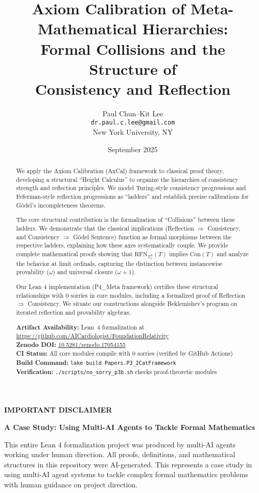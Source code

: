 \documentclass[11pt]{article}
\title{Axiom Calibration of Meta-Mathematical Hierarchies:\\
Formal Collisions and the Structure of\\
Consistency and Reflection}
\author{Paul Chun--Kit Lee\\
\texttt{dr.paul.c.lee@gmail.com}\\
New York University, NY}
\date{September 2025}
\newcommand{\Con}{\mathrm{Con}}
\newcommand{\RFNSigOne}{\mathrm{RFN}_{\Sigma^0_1}}
\begin{document}
\maketitle

\begin{abstract}
We apply the Axiom Calibration (AxCal) framework to classical proof theory, developing a structural ``Height Calculus'' to organize the hierarchies of consistency strength and reflection principles. We model Turing-style consistency progressions and Feferman-style reflection progressions as ``ladders'' and establish precise calibrations for Gödel's incompleteness theorems.

The core structural contribution is the formalization of ``Collisions'' between these ladders. We demonstrate that the classical implications (Reflection $\Rightarrow$ Consistency, and Consistency $\Rightarrow$ Gödel Sentence) function as formal morphisms between the respective ladders, explaining how these axes systematically couple. We provide complete mathematical proofs showing that $\RFNSigOne(T)$ implies $\Con(T)$ and analyze the behavior at limit ordinals, capturing the distinction between instancewise provability ($\omega$) and universal closure ($\omega+1$).

Our Lean 4 implementation (P4\_Meta framework) certifies these structural relationships with 0 sorries in core modules, including a formalized proof of Reflection $\Rightarrow$ Consistency. We situate our constructions alongside Beklemishev's program on iterated reflection and provability algebras.

\vspace{1em}
\noindent\textbf{Artifact Availability:} Lean~4 formalization at \url{https://github.com/AICardiologist/FoundationRelativity}\\
\textbf{Zenodo DOI:} \href{https://doi.org/10.5281/zenodo.17054155}{10.5281/zenodo.17054155}\\
\textbf{CI Status:} All core modules compile with 0 sorries (verified by GitHub Actions)\\
\textbf{Build Command:} \texttt{lake build Papers.P3\_2CatFramework}\\
\textbf{Verification:} \texttt{./scripts/no\_sorry\_p3b.sh} checks proof-theoretic modules
\end{abstract}

\begin{mdframed}[backgroundcolor=gray!10, linewidth=0pt]
\textbf{IMPORTANT DISCLAIMER}

\textbf{A Case Study: Using Multi-AI Agents to Tackle Formal Mathematics}

This entire Lean 4 formalization project was produced by multi-AI agents working under human direction. All proofs, definitions, and mathematical structures in this repository were AI-generated. This represents a case study in using multi-AI agent systems to tackle complex formal mathematics problems with human guidance on project direction.
\end{mdframed}
\end{document}
